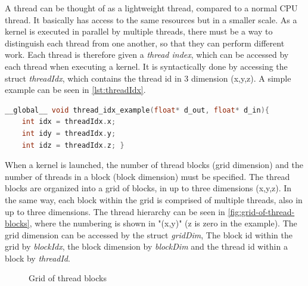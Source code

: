 A \cuda{} thread can be thought of as a lightweight thread, compared to a normal CPU thread.
It basically has access to the same resources but in a smaller scale.
As a kernel is executed in parallel by multiple threads, there must be a way to distinguish each thread from one another, so that they can perform different work.
Each thread is therefore given a \textit{thread index}, which can be accessed by each thread when executing a kernel.
It is syntactically done by accessing the struct \textit{threadIdx}, which contains the thread id in 3 dimension (x,y,z).
A simple example can be seen in \autoref{lst:threadIdx}.
\begin{lstlisting}[language=C,caption={Thread index example},label=lst:threadIdx]
__global__ void thread_idx_example(float* d_out, float* d_in){
	int idx = threadIdx.x;
	int idy = threadIdx.y;
	int idz = threadIdx.z; }
\end{lstlisting}
When a kernel is launched, the number of thread blocks (grid dimension) and the number of threads in a block (block dimension) must be specified.
The thread blocks are organized into a grid of blocks, in up to three dimensions (x,y,z).
In the same way, each block within the grid is comprised of multiple threads, also in up to three dimensions.
The thread hierarchy can be seen in \autoref{fig:grid-of-thread-blocks}, where the numbering is shown in "(x,y)" (z is zero in the example).
The grid dimension can be accessed by the struct \textit{gridDim}, The block id within the grid by \textit{blockIdx}, the block dimension by \textit{blockDim} and the thread id within a block by \textit{threadId}.
\begin{figure}[ht]
	\centering
	\caption{Grid of thread blocks}
	\label{fig:grid-of-thread-blocks}
\end{figure}
